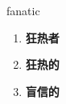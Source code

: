 
\begin{frame}
{\huge fanatic}
\begin{center}
\begin{enumerate}\Large
  \item \textbf{狂热者}
  \item \textbf{狂热的}
  \item \textbf{盲信的}
\end{enumerate}
\end{center}
\end{frame}
